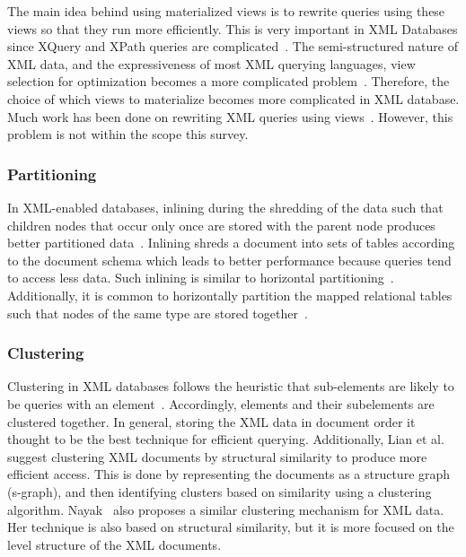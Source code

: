 \documentclass[12pt,a4paper]{article}
\begin{document}
The main idea behind using materialized views is to rewrite queries using these views so that they run more efficiently. This is very important in XML
Databases since XQuery and XPath queries are complicated~\cite{arion2007structured}. The semi-structured nature of
XML data, and the expressiveness of most XML querying languages, view selection for optimization becomes a more complicated
problem~\cite{tang2009materialized}. Therefore, the choice of which views to materialize becomes more complicated in XML database. Much work has been
done on rewriting XML queries using views~\cite{arion2007structured, balmin2004framework, aouiche2006clustering, tang2008multiple}. However, this problem is not
within the scope this survey.

\subsubsection{Partitioning}
In XML-enabled databases, inlining during the shredding of the data such that children nodes that occur only once are stored with the parent node produces
better partitioned data~\cite{tatarinov2002storing}. Inlining shreds a document into sets of tables according to the document schema which leads to better
performance because queries tend to access less data. Such inlining is similar to horizontal partitioning~\cite{ramanath2003searching}. Additionally, it is
common to horizontally partition the mapped relational tables such that nodes of the same type are stored together~\cite{amer2002overview}.

\subsubsection{Clustering}
Clustering in XML databases follows the heuristic that sub-elements are likely to be queries with an element~\cite{jagadish2002timber}. Accordingly, elements
and their subelements are clustered together. In general, storing the XML data in document order it thought to be the best technique for efficient querying.
Additionally, Lian et al.~\cite{lian2004efficient} suggest clustering XML documents by structural similarity to produce more efficient access. This is done by
representing the documents as a structure graph (s-graph), and then identifying clusters based on similarity using a clustering algorithm.
Nayak~\cite{nayak2008fast} also proposes a similar clustering mechanism for XML data. Her technique is also based on structural similarity, but it is more
focused on the level structure of the XML documents.
\end{document}
